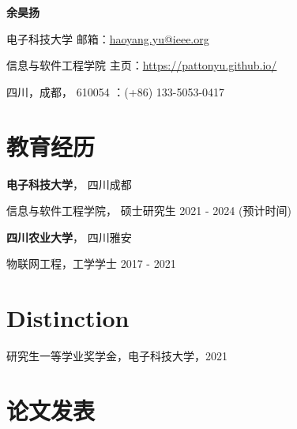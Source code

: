 \documentclass{article}
\begin{document}
\begin{center}
    \vspace*{5pt}
    \Huge{
    \textbf{余昊扬}}
\end{center}
\vspace{15pt}


\setlength{\parskip}{1pt}

\noindent 电子科技大学 \hfill 邮箱：\href{haoyang.yu@ieee.org}{haoyang.yu@ieee.org}

\noindent 信息与软件工程学院 \hfill 主页：\url{https://pattonyu.github.io/}

\noindent 四川，成都， 610054 ：(+86) 133-5053-0417

\setlength{\parskip}{3pt}






\section*{教育经历}
\indent 
\textbf{电子科技大学}， 四川成都

\hspace{2em}信息与软件工程学院， 硕士研究生 2021 - 2024 (预计时间)

\textbf{四川农业大学}， 四川雅安

\hspace{2em}物联网工程，工学学士 2017 - 2021




\section*{Distinction}
\indent
研究生一等学业奖学金，电子科技大学，2021



\section*{论文发表}


\end{document}
